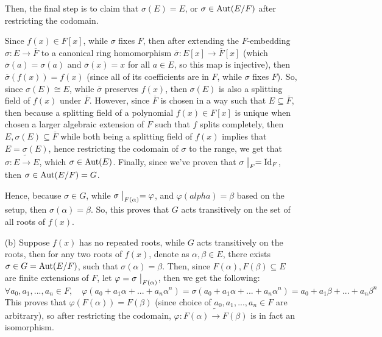 \documentclass{article}
\begin{document}
\begin{itemize}
    Then, the final step is to claim that $\sigma(E)=E$, or $\sigma\in \textmd{Aut}(E/F)$ after restricting the codomain.

    Since $f(x)\in F[x]$, while $\sigma$ fixes $F$, then after extending the $F$-embedding $\sigma:E\rightarrow\overline{F}$ to a canonical ring homomorphism $\overline{\sigma}:E[x]\rightarrow\overline{F}[x]$ (which $\overline{\sigma}(a)=\sigma(a)$ and $\overline{\sigma}(x)=x$ for all $a\in E$, so this map is injective), then $\overline{\sigma}(f(x)) = f(x)$ (since all of its coefficients are in $F$, while $\sigma$ fixes $F$). So, since $\sigma(E)\cong E$, while $\overline{\sigma}$ preserves $f(x)$, then $\sigma(E)$ is also a splitting field of $f(x)$ under $\overline{F}$. However, since $\overline{F}$ is chosen in a way such that $E\subseteq \overline{F}$, then because a splitting field of a polynomial $f(x)\in F[x]$ is unique when chosen a larger algebraic extension of $F$ such that $f$ splits completely, then $E,\sigma(E)\subseteq \overline{F}$ while both being a splitting field of $f(x)$ implies that $E=\sigma(E)$, hence restricting the codomain of $\sigma$ to the range, we get that $\sigma:E\tilde{\rightarrow} E$, which $\sigma\in \textmd{Aut}(E)$. Finally, since we've proven that $\sigma\bigm|_F = \textmd{Id}_F$, then $\sigma\in \textmd{Aut}(E/F) = G$.

    Hence, because $\sigma\in G$, while $\sigma\bigm|_{F(\alpha)}=\varphi$, and $\varphi(alpha)=\beta$ based on the setup, then $\sigma(\alpha)=\beta$. So, this proves that $G$ acts transitively on the set of all roots of $f(x)$.

    \hfil

    \item[(b)] Suppose $f(x)$ has no repeated roots, while $G$ acts transitively on the roots, then for any two roots of $f(x)$, denote as $\alpha,\beta \in E$, there exists $\sigma\in G=\textmd{Aut}(E/F)$, such that $\sigma(\alpha)=\beta$. Then, since $F(\alpha),F(\beta)\subseteq E$ are finite extensions of $F$, let $\varphi=\sigma\bigm|_{F(\alpha)}$, then we get the following:
    $$\forall a_0,a_1,...,a_n\in F,\quad \varphi(a_0+a_1\alpha+...+a_n\alpha^n) = \sigma(a_0+a_1\alpha+...+a_n\alpha^n) = a_0+a_1\beta + ... + a_n\beta^n$$
    This proves that $\varphi(F(\alpha))=F(\beta)$ (since choice of $a_0,a_1,...,a_n\in F$ are arbitrary), so after restricting the codomain, $\varphi:F(\alpha)\tilde{\rightarrow}F(\beta)$ is in fact an isomorphism.


\end{itemize}
\end{document}
